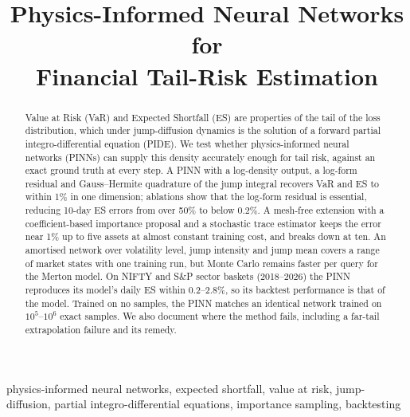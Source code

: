 \documentclass[conference]{IEEEtran}
\begin{document}
\title{Physics-Informed Neural Networks for\\ Financial Tail-Risk Estimation}

\author{
}

\maketitle

\begin{abstract}
Value at Risk (VaR) and Expected Shortfall (ES) are properties of the tail of the loss distribution, which
under jump-diffusion dynamics is the solution of a forward partial integro-differential equation (PIDE). We
test whether physics-informed neural networks (PINNs) can supply this density accurately enough for tail risk,
against an exact ground truth at every step. A PINN with a log-density output, a log-form residual and
Gauss--Hermite quadrature of the jump integral recovers VaR and ES to within 1\% in one dimension; ablations
show that the log-form residual is essential, reducing 10-day ES errors from over 50\% to below 0.2\%. A
mesh-free extension with a coefficient-based importance proposal and a stochastic trace estimator keeps the
error near 1\% up to five assets at almost constant training cost, and breaks down at ten. An amortised network
over volatility level, jump intensity and jump mean covers a range of market states with one training run, but
Monte Carlo remains faster per query for the Merton model. On NIFTY and S\&P sector baskets (2018--2026) the PINN
reproduces its model's daily ES within 0.2--2.8\%, so its backtest performance is that of the model. Trained on
no samples, the PINN matches an identical network trained on $10^5$--$10^6$ exact samples. We also document where
the method fails, including a far-tail extrapolation failure and its remedy.
\end{abstract}

\begin{IEEEkeywords}
physics-informed neural networks, expected shortfall, value at risk, jump-diffusion, partial
integro-differential equations, importance sampling, backtesting
\end{IEEEkeywords}

\end{document}

